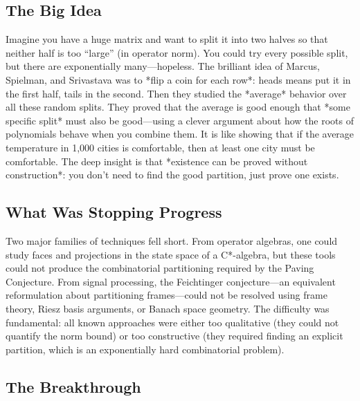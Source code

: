 \subsection{The Big Idea}
Imagine you have a huge matrix and want to split it into two halves so that neither half is too ``large'' (in operator norm). You could try every possible split, but there are exponentially many---hopeless. The brilliant idea of Marcus, Spielman, and Srivastava was to *flip a coin for each row*: heads means put it in the first half, tails in the second. Then they studied the *average* behavior over all these random splits. They proved that the average is good enough that *some specific split* must also be good---using a clever argument about how the roots of polynomials behave when you combine them. It is like showing that if the average temperature in 1,000 cities is comfortable, then at least one city must be comfortable. The deep insight is that *existence can be proved without construction*: you don't need to find the good partition, just prove one exists.

\subsection{What Was Stopping Progress}
Two major families of techniques fell short. From operator algebras, one could study faces and projections in the state space of a C*-algebra, but these tools could not produce the combinatorial partitioning required by the Paving Conjecture. From signal processing, the Feichtinger conjecture---an equivalent reformulation about partitioning frames---could not be resolved using frame theory, Riesz basis arguments, or Banach space geometry. The difficulty was fundamental: all known approaches were either too qualitative (they could not quantify the norm bound) or too constructive (they required finding an explicit partition, which is an exponentially hard combinatorial problem).

\subsection{The Breakthrough}

